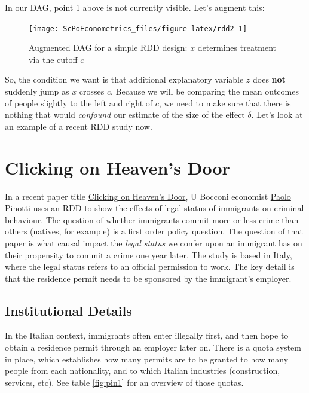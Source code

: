 \documentclass[]{book}
\begin{document}
In our DAG, point 1 above is not currently visible. Let's augment this:

\begin{figure}

{\centering \texttt{[image: ScPoEconometrics\_files/figure-latex/rdd2-1]} 

}

\caption{Augmented DAG for a simple RDD design: $x$ determines treatment via the cutoff $c$}\label{fig:rdd2}
\end{figure}

So, the condition we want is that additional explanatory variable \(z\) does \textbf{not} suddenly jump as \(x\) crosses \(c\). Because we will be comparing the mean outcomes of people slightly to the left and right of \(c\), we need to make sure that there is nothing that would \emph{confound} our estimate of the size of the effect \(\delta\). Let's look at an example of a recent RDD study now.

\hypertarget{clicking-on-heavens-door}{%
\section{Clicking on Heaven's Door}\label{clicking-on-heavens-door}}

In a recent paper title \href{https://www.aeaweb.org/articles?id=10.1257/aer.20150355}{Clicking on Heaven's Door}, U Bocconi economist \href{https://sites.google.com/view/paolo-pinotti/home}{Paolo Pinotti} uses an RDD to show the effects of legal status of immigrants on criminal behaviour. The question of whether immigrants commit more or less crime than others (natives, for example) is a first order policy question. The question of that paper is what causal impact the \emph{legal status} we confer upon an immigrant has on their propensity to commit a crime one year later. The study is based in Italy, where the legal status refers to an official permission to work. The key detail is that the residence permit needs to be sponsored by the immigrant's employer.

\hypertarget{institutional-details}{%
\subsection{Institutional Details}\label{institutional-details}}

In the Italian context, immigrants often enter illegally first, and then hope to obtain a residence permit through an employer later on. There is a quota system in place, which establishes how many permits are to be granted to how many people from each nationality, and to which Italian industries (construction, services, etc). See table \ref{fig:pin1} for an overview of those quotas.
\end{document}
